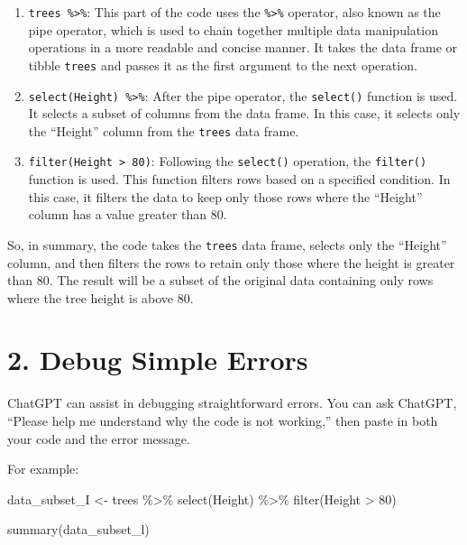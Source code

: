 \documentclass[
  letterpaper,
  DIV=11,
  numbers=noendperiod]{scrreprt}
\newenvironment{Shaded}{\begin{snugshade}}{\end{snugshade}}
\newcommand{\DecValTok}[1]{\textcolor[rgb]{0.68,0.00,0.00}{#1}}
\newcommand{\FunctionTok}[1]{\textcolor[rgb]{0.28,0.35,0.67}{#1}}
\newcommand{\NormalTok}[1]{\textcolor[rgb]{0.00,0.23,0.31}{#1}}
\newcommand{\OtherTok}[1]{\textcolor[rgb]{0.00,0.23,0.31}{#1}}
\newcommand{\SpecialCharTok}[1]{\textcolor[rgb]{0.37,0.37,0.37}{#1}}
\begin{document}
\begin{enumerate}
\def\labelenumi{\arabic{enumi}.}
\item
  \texttt{trees\ \%\textgreater{}\%}: This part of the code uses the
  \texttt{\%\textgreater{}\%} operator, also known as the pipe operator,
  which is used to chain together multiple data manipulation operations
  in a more readable and concise manner. It takes the data frame or
  tibble \texttt{trees} and passes it as the first argument to the next
  operation.
\item
  \texttt{select(Height)\ \%\textgreater{}\%}: After the pipe operator,
  the \texttt{select()} function is used. It selects a subset of columns
  from the data frame. In this case, it selects only the ``Height''
  column from the \texttt{trees} data frame.
\item
  \texttt{filter(Height\ \textgreater{}\ 80)}: Following the
  \texttt{select()} operation, the \texttt{filter()} function is used.
  This function filters rows based on a specified condition. In this
  case, it filters the data to keep only those rows where the ``Height''
  column has a value greater than 80.
\end{enumerate}

So, in summary, the code takes the \texttt{trees} data frame, selects
only the ``Height'' column, and then filters the rows to retain only
those where the height is greater than 80. The result will be a subset
of the original data containing only rows where the tree height is above
80.

\hypertarget{debug-simple-errors}{%
\section{2. Debug Simple Errors}\label{debug-simple-errors}}

ChatGPT can assist in debugging straightforward errors. You can ask
ChatGPT, ``Please help me understand why the code is not working,'' then
paste in both your code and the error message.

For example:

\begin{Shaded}
\begin{Highlighting}[]
\NormalTok{data\_subset\_I }\OtherTok{\textless{}{-}} 
\NormalTok{  trees }\SpecialCharTok{\%\textgreater{}\%}
  \FunctionTok{select}\NormalTok{(Height) }\SpecialCharTok{\%\textgreater{}\%} 
  \FunctionTok{filter}\NormalTok{(Height }\SpecialCharTok{\textgreater{}} \DecValTok{80}\NormalTok{)}

\FunctionTok{summary}\NormalTok{(data\_subset\_l)}
\end{Highlighting}
\end{Shaded}
\end{document}
